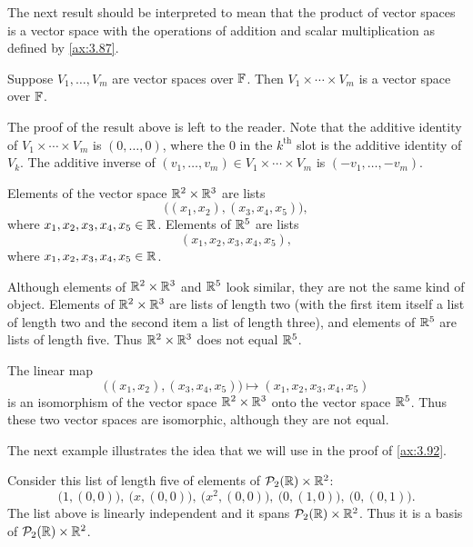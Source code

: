 The next result should be interpreted to mean that the product of vector spaces
is a vector space with the operations of addition and scalar multiplication as
defined by \ref{ax:3.87}.

\begin{result}\label{ax:3.89}
Suppose $V_1,\dots,V_m$ are vector spaces over $\mathbb{F}$. Then
$V_1\times\cdots\times V_m$ is a vector space over $\mathbb{F}$.
\end{result}

The proof of the result above is left to the reader. Note that the additive
identity of $V_1\times\cdots\times V_m$ is $(0,\dots,0)$, where the $0$ in the
$k^{\text{th}}$ slot is the additive identity of $V_k$. The additive inverse of
$(v_1,\dots,v_m)\in V_1\times\cdots\times V_m$ is $(-v_1,\dots,-v_m)$.

\begin{example}\label{ax:3.90}
Elements of the vector space $\mathbb{R}^2\times\mathbb{R}^3$ are lists
\[ \bigl((x_1,x_2),(x_3,x_4,x_5)\bigr), \]
where $x_1,x_2,x_3,x_4,x_5\in\mathbb{R}$. Elements of $\mathbb{R}^5$ are lists
\[ (x_1,x_2,x_3,x_4,x_5), \]
where $x_1,x_2,x_3,x_4,x_5\in\mathbb{R}$.

Although elements of $\mathbb{R}^2\times\mathbb{R}^3$ and $\mathbb{R}^5$ look similar, they are not the
same kind of object. Elements of $\mathbb{R}^2\times\mathbb{R}^3$ are lists of length two (with
the first item itself a list of length two and the second item a list of length
three), and elements of $\mathbb{R}^5$ are lists of length five. Thus $\mathbb{R}^2\times\mathbb{R}^3$
does not equal $\mathbb{R}^5$.

The linear map
\[ \bigl((x_1,x_2),(x_3,x_4,x_5)\bigr) \mapsto (x_1,x_2,x_3,x_4,x_5) \]
is an isomorphism of the vector space $\mathbb{R}^2\times\mathbb{R}^3$ onto the vector space
$\mathbb{R}^5$. Thus these two vector spaces are isomorphic, although they are not
equal.
\end{example}

%
The next example illustrates the idea that we will use in the proof of
\ref{ax:3.92}.

\begin{example}\label{ax:3.91}
Consider this list of length five of elements of $\mathcal{P}_2(\mathbb{R})\times\mathbb{R}^2$:
\[ \bigl(1,(0,0)\bigr),\ \bigl(x,(0,0)\bigr),\ \bigl(x^2,(0,0)\bigr),\
   \bigl(0,(1,0)\bigr),\ \bigl(0,(0,1)\bigr). \]
The list above is linearly independent and it spans $\mathcal{P}_2(\mathbb{R})\times\mathbb{R}^2$.
Thus it is a basis of $\mathcal{P}_2(\mathbb{R})\times\mathbb{R}^2$.
\end{example}

